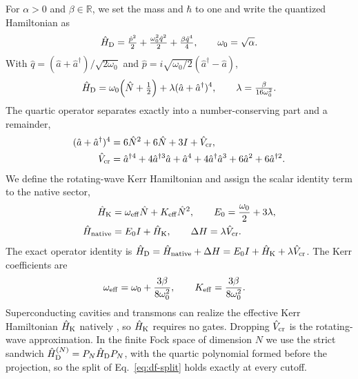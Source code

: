 \documentclass[pra,twocolumn,superscriptaddress,nofootinbib,floatfix]{revtex4-2}
\theoremstyle{remark}
\begin{document}
For \(\alpha>0\) and \(\beta\in\mathbb{R}\), we set the mass and \(\hbar\) to one and write the quantized Hamiltonian as
\begin{align}
\hat H_{\rm D}=\tfrac{\hat p^2}{2}+\tfrac{\omega_0^2\hat q^2}{2}+\tfrac{\beta\hat q^4}{4},\qquad\omega_0=\sqrt\alpha .
\label{eq:df-ham}
\end{align}
With $\hat q=(\hat a+\hat a^\dagger)/\sqrt{2\omega_0}$ and $\hat p=i\sqrt{\omega_0/2}(\hat a^\dagger-\hat a)$,
\begin{align}
\hat H_{\rm D}=\omega_0\Bigl(\hat N+\tfrac12\Bigr)+\lambda(\hat a+\hat a^\dagger)^4,\qquad\lambda=\tfrac{\beta}{16\omega_0^2}.
\end{align}
The quartic operator separates exactly into a number-conserving part and a remainder,
\begin{align}
(\hat a+\hat a^\dagger)^4&=6\hat N^2+6\hat N+3I+\hat V_{\rm cr},\nonumber\\
\hat V_{\rm cr}&=\hat a^{\dagger4}+4\hat a^{\dagger3}\hat a+\hat a^4+4\hat a^\dagger\hat a^3+6\hat a^2+6\hat a^{\dagger2}.
\label{eq:df-vcr}
\end{align}
We define the rotating-wave Kerr Hamiltonian and assign the scalar identity term to the native sector,
\begin{align}
\hat H_{\rm K} &= \omega_{\rm eff}\hat N+K_{\rm eff}\hat N^2,\qquad E_0=\frac{\omega_0}{2}+3\lambda,\\
\hat H_{\rm native} &= E_0 I+\hat H_{\rm K},\qquad \Delta H=\lambda\hat V_{\rm cr}.
\label{eq:df-split}
\end{align}
The exact operator identity is \(\hat H_{\rm D}=\hat H_{\rm native}+\Delta H=E_0 I+\hat H_{\rm K}+\lambda\hat V_{\rm cr}\). The Kerr coefficients are
\begin{align}
\omega_{\rm eff} &= \omega_0+\frac{3\beta}{8\omega_0^2},\qquad K_{\rm eff}=\frac{3\beta}{8\omega_0^2}.
\label{eq:df-fock-kerr}
\end{align}
Superconducting cavities and transmons can realize the effective Kerr Hamiltonian \(\hat H_{\rm K}\) natively \cite{Drummond1980QuantumTO, Koch_2007, Blais_2021}, so $\hat H_{\rm K}$ requires no gates. Dropping $\hat V_{\rm cr}$ is the rotating-wave approximation. In the finite Fock space of dimension \(N\) we use the strict sandwich \(\hat H_{\rm D}^{(N)}=P_N\hat H_{\rm D}P_N\), with the quartic polynomial formed before the projection, so the split of Eq.~\eqref{eq:df-split} holds exactly at every cutoff.
\end{document}
